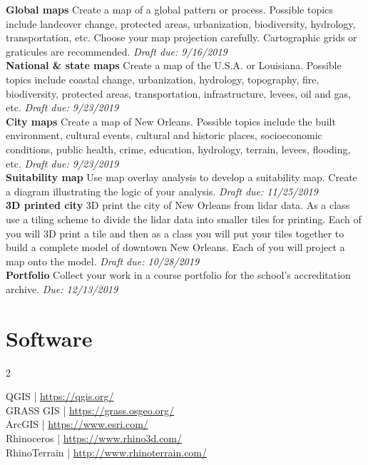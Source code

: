 \documentclass[11pt,article,oneside]{memoir}
\begin{document}
\noindent \textbf{Global maps}
Create a map of a global pattern or process. 
Possible topics include landcover change, protected areas,
urbanization, biodiversity, hydrology, transportation, etc.
Choose your map projection carefully.
Cartographic grids or graticules are recommended.
\emph{Draft due: 9/16/2019}\\

\noindent \textbf{National \& state maps}
Create a map of the U.S.A. or Louisiana.
Possible topics include coastal change, urbanization, hydrology, topography, fire,
biodiversity, protected areas, transportation, infrastructure, levees, oil and gas, etc.
\emph{Draft due: 9/23/2019}\\

\noindent \textbf{City maps}
Create a map of New Orleans. 
Possible topics include the built environment, 
cultural events, cultural and historic places, 
socioeconomic conditions, public health, crime, education, 
hydrology, terrain, levees, flooding, etc.
\emph{Draft due: 9/23/2019}\\

\noindent \textbf{Suitability map}
Use map overlay analysis 
to develop a suitability map.
Create a diagram illustrating 
the logic of your analysis.
\emph{Draft due: 11/25/2019}\\

\noindent \textbf{3D printed city}
3D print the city of New Orleans from lidar data. 
As a class use a tiling scheme 
to divide the lidar data into smaller tiles for printing.
Each of you will 3D print a tile and then
as a class you will put your tiles together 
to build a complete model of downtown New Orleans.
Each of you will project a map onto the model.
\emph{Draft due: 10/28/2019}\\

\noindent \textbf{Portfolio}
Collect your work in a course portfolio 
for the school's accreditation archive.
\emph{Due: 12/13/2019}\\

\noindent



\clearpage

\section{Software}
\begin{multicols}{2}
\raggedright
QGIS | \url{https://qgis.org/}\\
GRASS GIS | \url{https://grass.osgeo.org/}\\
ArcGIS | \url{https://www.esri.com/}\\
Rhinoceros | \url{https://www.rhino3d.com/}\\
RhinoTerrain | \url{http://www.rhinoterrain.com/}\\
\end{multicols}
\end{document}
